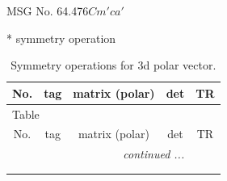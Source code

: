 \documentclass[fleqn,8pt]{jsarticle}
\begin{document}
\setcounter{MaxMatrixCols}{32}

\renewcommand{\tablename}{Table~}
\renewcommand{\figurename}{Figure~}
\begin{center}
\LARGE
MSG No. 64.476\quad$Cm'ca'$
\end{center}
* symmetry operation
\renewcommand{\arraystretch}{1.3}
\begin{longtable}{ccccc}
\caption{Symmetry operations for 3d polar vector.}
 \\
 \hline \hline
No. & tag & matrix (polar) & det & TR \\ \hline \endfirsthead

\multicolumn{4}{l}{\tablename\ \thetable{}} \\
 \hline \hline
No. & tag & matrix (polar) & det & TR \\ \hline \endhead

 \hline \hline
\multicolumn{4}{r}{\footnotesize\it continued ...} \\ \endfoot

 \hline \hline
\multicolumn{4}{r}{} \\ \endlastfoot


\end{longtable}
\end{document}
